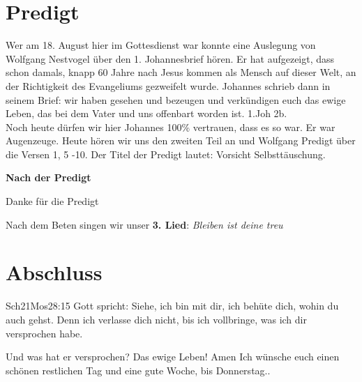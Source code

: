 \documentclass{../inc/mybib}
\begin{document}
\section{Predigt}
Wer am 18. August hier im Gottesdienst war konnte eine Auslegung von Wolfgang Nestvogel über den 1. Johannesbrief hören. Er hat aufgezeigt, dass schon damals, knapp 60 Jahre nach Jesus kommen als Mensch auf dieser Welt, an der Richtigkeit des Evangeliums gezweifelt wurde. Johannes schrieb dann in seinem Brief: wir haben gesehen und bezeugen und verkündigen euch das ewige Leben, das bei dem Vater und uns offenbart worden ist. 1.Joh 2b.\\
Noch heute dürfen wir hier Johannes 100\% vertrauen, dass es so war. Er war Augenzeuge. Heute hören wir uns den zweiten Teil an und Wolfgang Predigt über die Versen 1, 5 -10. Der Titel der Predigt lautet: Vorsicht Selbsttäuschung.

\textbf{Nach der Predigt}

Danke für die Predigt

Nach dem Beten singen wir unser \textbf{3. Lied}: \textit{Bleiben ist deine treu}\\

\section{Abschluss}

\begin{bibeltext}{Sch2}{1Mos}{28:15}
Gott spricht: Siehe, ich bin mit dir,
ich behüte dich, wohin du auch gehst.
Denn ich verlasse dich nicht,
bis ich vollbringe, was ich dir versprochen habe.
\end{bibeltext}
Und was hat er versprochen? Das ewige Leben!
Amen
Ich wünsche euch einen schönen restlichen Tag und eine gute Woche, bis Donnerstag..
\end{document}
